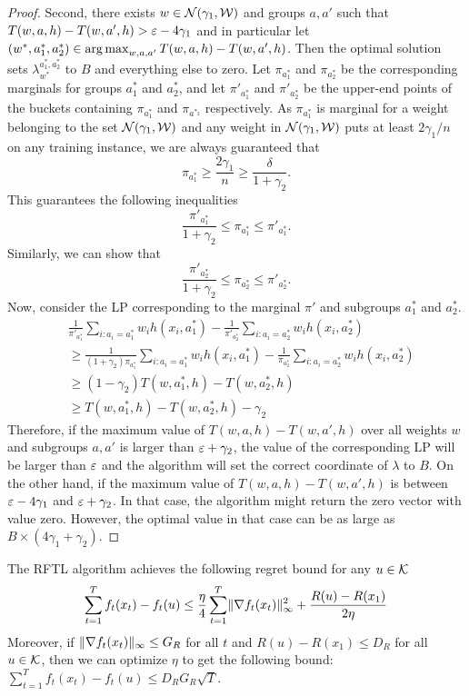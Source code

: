\begin{proof}
Second, there exists $w \in \mathcal{N}(\gamma_1,\mathcal{W})$ and groups $a,a'$ such that $T(w,a,h) - T(w,a',h) > \varepsilon - 4\gamma_1$ and in particular let $(w^*,a^*_1,a^{*}_2) \in \operatorname*{arg\,max}_{w,a,a'} T(w,a,h) - T(w,a',h)$. Then the optimal solution sets $\lambda^{a^*_1,a^{*}_2}_{w^*}$ to $B$ and everything else to zero. Let $\pi_{a^*_1}$ and $\pi_{a^{*}_2}$ be the corresponding marginals for groups $a^*_1$ and $a^*_2$, and let $\pi'_{a^*_1}$ and $\pi'_{a^{*}_2}$ be the upper-end points of the buckets containing $\pi_{a^*_1}$ and $\pi_{a^{*_2}}$ respectively. 
%
As $\pi_{a^*_1}$ is marginal for a weight belonging to the set $\mathcal{N}(\gamma_1,\mathcal{W})$ and any weight in $\mathcal{N}(\gamma_1,\mathcal{W})$ puts at least $2\gamma_1/n$ on any training instance, we are always guaranteed that 
$$\pi_{a^*_1} \ge \frac{2\gamma_1}{n} \ge \frac{\delta}{1+\gamma_2}.$$
This guarantees the following inequalities
$$ \frac{\pi'_{a^*_1}}{1 + \gamma_2} \le \pi_{a^*_1} \le \pi'_{a^*_1}.$$
Similarly, we can show that
$$\frac{\pi'_{a^{*}_2}}{1 + \gamma_2} \le \pi_{a^{*}_2} \le \pi'_{a^{*}_2}.$$
Now, consider the LP corresponding to the marginal $\pi'$ and subgroups $a^*_1$ and $a^{*}_2$. 
\begin{align*}
&\frac{1}{\pi'_{a^*_1}} \sum_{i:a_i = a^*_1} w_i h(x_i,a^*_1) - \frac{1}{\pi'_{a^{*}_2}} \sum_{i:a_i = a^{*}_2} w_i h(x_i,a^{*}_2) \\
&\ge \frac{1}{(1+\gamma_2) \pi_{a^*_1}} \sum_{i:a_i = a^*_1} w_i h(x_i,a^*_1) - \frac{1}{\pi_{a^{*}_2}} \sum_{i:a_i = a^{*}_2} w_i h(x_i,a^{*}_2)  \\
&\ge (1-\gamma_2) T(w,a^*_1,h) - T(w,a^{*}_2,h)\\
&\ge T(w,a^*_1,h) - T(w,a^{*}_2,h) - \gamma_2
\end{align*}
Therefore, if the maximum value of $T(w,a,h) - T(w,a',h)$ over all weights $w$ and subgroups $a,a'$ is larger than $\varepsilon + \gamma_2$, the value of the corresponding LP will be larger than $\varepsilon$ and the algorithm will set the correct coordinate of $\lambda$ to $B$. On the other hand, if the maximum value of $T(w,a,h) - T(w,a',h)$ is between $\varepsilon - 4\gamma_1$ and $\varepsilon+\gamma_2$. In that case, the algorithm might return the zero vector with value zero. However, the optimal value in that case can be as large as $B \times (4\gamma_1 + \gamma_2)$.
\end{proof}

\begin{lemma}\label{thm:rftl-guarantee}
The RFTL algorithm achieves the following regret bound for any $u \in \mathcal{K}$
$$\sum_{t=1}^T f_t(x_t) - f_t(u) \le \frac{\eta}{4} \sum_{t=1}^T \lVert \nabla f_t(x_t) \rVert_{\infty}^{2} + \frac{R(u) - R(x_1)}{2 \eta}$$
Moreover, if $\lVert \nabla f_t(x_t) \rVert_{\infty} \le G_R$ for all $t$ and $R(u) - R(x_1) \le D_R$ for all $u \in \mathcal{K}$, then we can optimize $\eta$ to get the following bound: $\sum_{t=1}^T f_t(x_t) - f_t(u) \le D_R G_R \sqrt{T}$.
\end{lemma}

